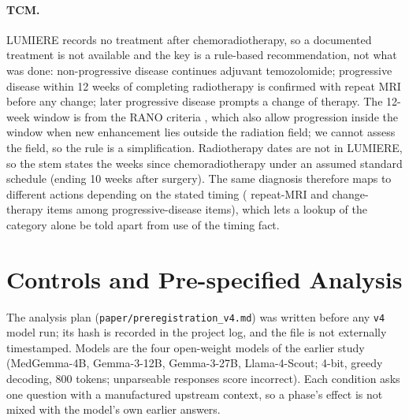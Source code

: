 \documentclass[11pt]{article}
\begin{document}
\paragraph{TCM.} LUMIERE records no treatment after chemoradiotherapy, so a documented treatment is not available and the key is a rule-based recommendation, not what was done: non-progressive disease continues adjuvant temozolomide; progressive disease within 12 weeks of completing radiotherapy is confirmed with repeat MRI before any change; later progressive disease prompts a change of therapy. The 12-week window is from the RANO criteria \citep{wen2010updated}, which also allow progression inside the window when new enhancement lies outside the radiation field; we cannot assess the field, so the rule is a simplification. Radiotherapy dates are not in LUMIERE, so the stem states the weeks since chemoradiotherapy under an assumed standard schedule (ending 10 weeks after surgery). The same diagnosis therefore maps to different actions depending on the stated timing (\vfourTcmConfirm{} repeat-MRI and \vfourTcmEscalate{} change-therapy items among \vfourTcmPdItems{} progressive-disease items), which lets a lookup of the category alone be told apart from use of the timing fact.

\section{Controls and Pre-specified Analysis}
\label{sec:controls}

The analysis plan (\texttt{paper/preregistration\_v4.md}) was written before any \texttt{v4} model run; its hash is recorded in the project log, and the file is not externally timestamped. Models are the four open-weight models of the earlier study (MedGemma-4B, Gemma-3-12B, Gemma-3-27B, Llama-4-Scout; 4-bit, greedy decoding, 800 tokens; unparseable responses score incorrect). Each condition asks one question with a manufactured upstream context, so a phase's effect is not mixed with the model's own earlier answers.
\end{document}
